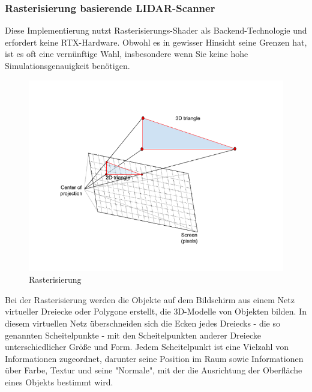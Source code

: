 \subsubsection*{Rasterisierung basierende LIDAR-Scanner}



Diese Implementierung nutzt Rasterisierungs-Shader als Backend-Technologie und erfordert keine RTX-Hardware. Obwohl es in gewisser Hinsicht seine Grenzen hat, ist es oft eine vernünftige Wahl, insbesondere wenn Sie keine hohe Simulationsgenauigkeit benötigen.\\

\begin{figure}[htp]
    \centering
    \includegraphics[width=(\textwidth/2)]{images/projection_3d_to_screen.png}
    \caption{Rasterisierung}
    \label{fig:Rasterisierung}
\end{figure}


Bei der Rasterisierung werden die Objekte auf dem Bildschirm aus einem Netz virtueller Dreiecke oder Polygone erstellt, die 3D-Modelle von Objekten bilden. In diesem virtuellen Netz überschneiden sich die Ecken jedes Dreiecks - die so genannten Scheitelpunkte - mit den Scheitelpunkten anderer Dreiecke unterschiedlicher Größe und Form. Jedem Scheitelpunkt ist eine Vielzahl von Informationen zugeordnet, darunter seine Position im Raum sowie Informationen über Farbe, Textur und seine "Normale", mit der die Ausrichtung der Oberfläche eines Objekts bestimmt wird.\\

